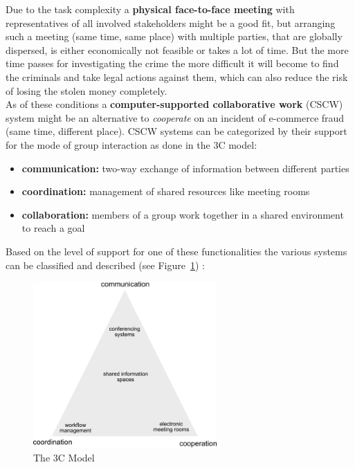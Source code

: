 Due to the task complexity a \textbf{physical face-to-face meeting} with representatives of all involved stakeholders might be a good fit, but arranging such a meeting (same time, same place) with multiple parties,
that are globally dispersed, is either economically not feasible or takes a lot of time. But the more time passes for investigating the crime the more difficult it will become to find the criminals and take legal actions against them,
which can also reduce the risk of losing the stolen money completely. \\

As of these conditions a \textbf{computer-supported collaborative work} (CSCW) system might be an alternative to \textit{cooperate} on an incident of e-commerce fraud (same time, different place).
CSCW systems can be categorized by their support for the mode of group interaction as done in the 3C model:

\begin{itemize}
    \item\textbf{communication:} two-way exchange of information between different parties
    \item\textbf{coordination:} management of shared resources like meeting rooms
    \item\textbf{collaboration:} members of a group work together in a shared environment to reach a goal
\end{itemize}

Based on the level of support for one of these functionalities the various systems can be classified and described (see Figure~\ref{fig:images_3C_model}) \citep{Koch2008}:

\begin{figure}[H]
	\centering
		\includegraphics[height=2.5in]{images/3C-model.pdf}
	\caption{The 3C Model \citep{Koch2008}}
\label{fig:images_3C_model}
\end{figure}

